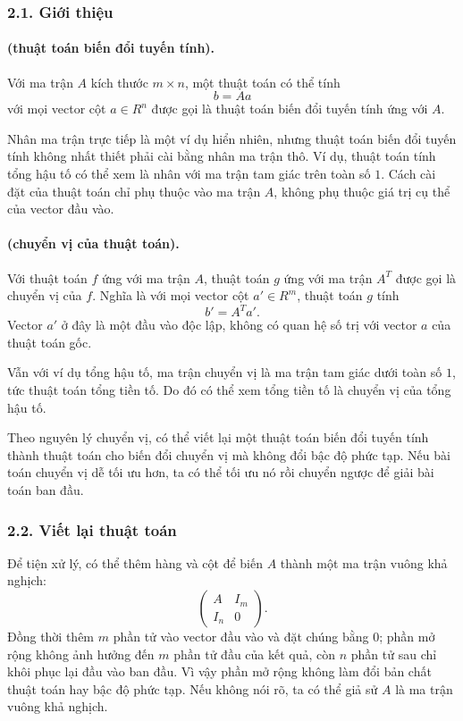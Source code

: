 \documentclass[11pt]{article}
\begin{document}
\subsubsection*{2.1. Giới thiệu}

\paragraph{ (thuật toán biến đổi tuyến tính).}
Với ma trận \(A\) kích thước \(m\times n\), một thuật toán có thể tính
\[
  b=Aa
\]
với mọi vector cột \(a\in R^n\) được gọi là thuật toán biến đổi tuyến tính ứng
với \(A\).

Nhân ma trận trực tiếp là một ví dụ hiển nhiên, nhưng thuật toán biến đổi tuyến
tính không nhất thiết phải cài bằng nhân ma trận thô. Ví dụ, thuật toán tính
tổng hậu tố có thể xem là nhân với ma trận tam giác trên toàn số \(1\). Cách
cài đặt của thuật toán chỉ phụ thuộc vào ma trận \(A\), không phụ thuộc giá trị
cụ thể của vector đầu vào.

\paragraph{ (chuyển vị của thuật toán).}
Với thuật toán \(f\) ứng với ma trận \(A\), thuật toán \(g\) ứng với ma trận
\(A^T\) được gọi là chuyển vị của \(f\). Nghĩa là với mọi vector cột
\(a'\in R^m\), thuật toán \(g\) tính
\[
  b'=A^T a'.
\]
Vector \(a'\) ở đây là một đầu vào độc lập, không có quan hệ số trị với vector
\(a\) của thuật toán gốc.

Vẫn với ví dụ tổng hậu tố, ma trận chuyển vị là ma trận tam giác dưới toàn số
\(1\), tức thuật toán tổng tiền tố. Do đó có thể xem tổng tiền tố là chuyển vị
của tổng hậu tố.

Theo nguyên lý chuyển vị, có thể viết lại một thuật toán biến đổi tuyến tính
thành thuật toán cho biến đổi chuyển vị mà không đổi bậc độ phức tạp. Nếu bài
toán chuyển vị dễ tối ưu hơn, ta có thể tối ưu nó rồi chuyển ngược để giải bài
toán ban đầu.

\subsubsection*{2.2. Viết lại thuật toán}

Để tiện xử lý, có thể thêm hàng và cột để biến \(A\) thành một ma trận vuông
khả nghịch:
\[
  \begin{pmatrix}
    A&I_m\\
    I_n&0
  \end{pmatrix}.
\]
Đồng thời thêm \(m\) phần tử vào vector đầu vào và đặt chúng bằng \(0\); phần
mở rộng không ảnh hưởng đến \(m\) phần tử đầu của kết quả, còn \(n\) phần tử
sau chỉ khôi phục lại đầu vào ban đầu. Vì vậy phần mở rộng không làm đổi bản
chất thuật toán hay bậc độ phức tạp. Nếu không nói rõ, ta có thể giả sử \(A\)
là ma trận vuông khả nghịch.
\end{document}
